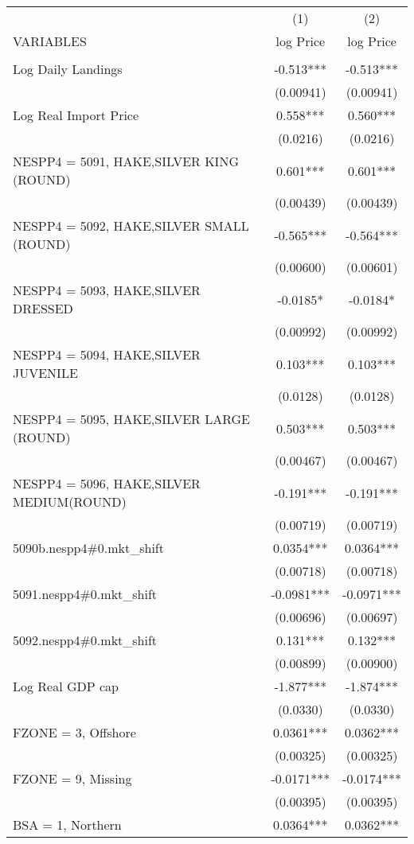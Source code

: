 \begin{tabular}{lcc} \hline
 & (1) & (2) \\
VARIABLES & log Price & log Price \\ \hline
 &  &  \\
Log Daily Landings & -0.513*** & -0.513*** \\
 & (0.00941) & (0.00941) \\
Log Real Import Price & 0.558*** & 0.560*** \\
 & (0.0216) & (0.0216) \\
NESPP4 = 5091, HAKE,SILVER KING (ROUND) & 0.601*** & 0.601*** \\
 & (0.00439) & (0.00439) \\
NESPP4 = 5092, HAKE,SILVER SMALL (ROUND) & -0.565*** & -0.564*** \\
 & (0.00600) & (0.00601) \\
NESPP4 = 5093, HAKE,SILVER DRESSED & -0.0185* & -0.0184* \\
 & (0.00992) & (0.00992) \\
NESPP4 = 5094, HAKE,SILVER JUVENILE & 0.103*** & 0.103*** \\
 & (0.0128) & (0.0128) \\
NESPP4 = 5095, HAKE,SILVER LARGE (ROUND) & 0.503*** & 0.503*** \\
 & (0.00467) & (0.00467) \\
NESPP4 = 5096, HAKE,SILVER MEDIUM(ROUND) & -0.191*** & -0.191*** \\
 & (0.00719) & (0.00719) \\
5090b.nespp4\#0.mkt\_shift & 0.0354*** & 0.0364*** \\
 & (0.00718) & (0.00718) \\
5091.nespp4\#0.mkt\_shift & -0.0981*** & -0.0971*** \\
 & (0.00696) & (0.00697) \\
5092.nespp4\#0.mkt\_shift & 0.131*** & 0.132*** \\
 & (0.00899) & (0.00900) \\
Log Real GDP cap & -1.877*** & -1.874*** \\
 & (0.0330) & (0.0330) \\
FZONE = 3, Offshore & 0.0361*** & 0.0362*** \\
 & (0.00325) & (0.00325) \\
FZONE = 9, Missing & -0.0171*** & -0.0174*** \\
 & (0.00395) & (0.00395) \\
BSA = 1, Northern & 0.0364*** & 0.0362*** \\

\end{tabular}
